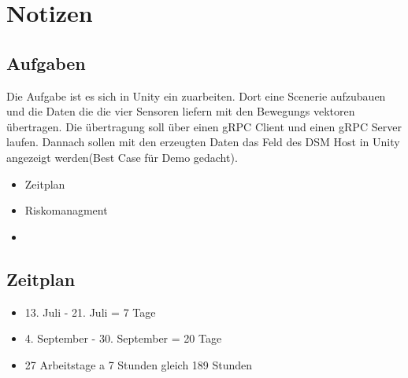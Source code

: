 \section{Notizen}
\subsection{Aufgaben}
Die Aufgabe ist es sich in Unity ein zuarbeiten. Dort eine Scenerie aufzubauen und die Daten die die vier Sensoren liefern mit den Bewegungs vektoren übertragen.
Die übertragung soll über einen gRPC Client und einen gRPC Server laufen. Dannach sollen mit den erzeugten Daten das Feld des DSM Host in Unity angezeigt werden(Best Case für Demo gedacht).
\begin{itemize}
    \item Zeitplan
    \item Riskomanagment
    \item 
\end{itemize}
\subsection{Zeitplan}

\begin{itemize}
    \item 13. Juli - 21. Juli = 7 Tage
    \item 4. September - 30. September = 20 Tage
    \item 27 Arbeitstage a 7 Stunden gleich 189 Stunden
\end{itemize}




